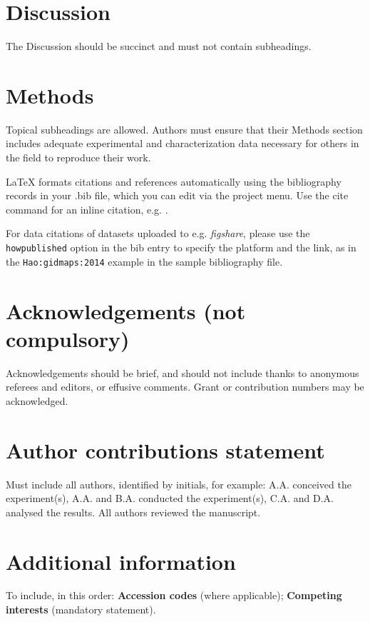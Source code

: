 \documentclass[fleqn,10pt]{wlscirep}
\begin{document}
\section*{Discussion}

The Discussion should be succinct and must not contain subheadings.

\section*{Methods}

Topical subheadings are allowed. Authors must ensure that their Methods section includes adequate experimental and characterization data necessary for others in the field to reproduce their work.



\noindent LaTeX formats citations and references automatically using the bibliography records in your .bib file, which you can edit via the project menu. Use the cite command for an inline citation, e.g.  \cite{Hao:gidmaps:2014}.

For data citations of datasets uploaded to e.g. \emph{figshare}, please use the \verb|howpublished| option in the bib entry to specify the platform and the link, as in the \verb|Hao:gidmaps:2014| example in the sample bibliography file.

\section*{Acknowledgements (not compulsory)}

Acknowledgements should be brief, and should not include thanks to anonymous referees and editors, or effusive comments. Grant or contribution numbers may be acknowledged.

\section*{Author contributions statement}

Must include all authors, identified by initials, for example:
A.A. conceived the experiment(s),  A.A. and B.A. conducted the experiment(s), C.A. and D.A. analysed the results.  All authors reviewed the manuscript. 

\section*{Additional information}

To include, in this order: \textbf{Accession codes} (where applicable); \textbf{Competing interests} (mandatory statement). 
\end{document}
